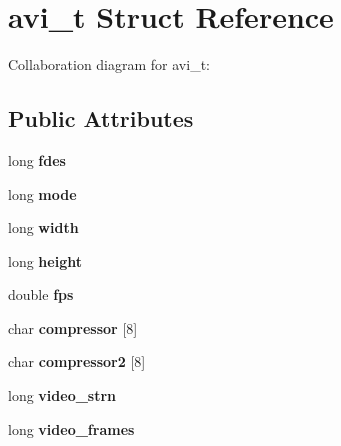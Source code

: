 \hypertarget{structavi__t}{\section{avi\+\_\+t Struct Reference}
\label{structavi__t}
}


Collaboration diagram for avi\+\_\+t\+:
\subsection*{Public Attributes}
\begin{DoxyCompactItemize}
\item 
\hypertarget{structavi__t_a6306b092bffe21a7b01c55494392ee18}{long {\bfseries fdes}}\label{structavi__t_a6306b092bffe21a7b01c55494392ee18}

\item 
\hypertarget{structavi__t_a41e8787d0a73697e8e62dc80a2c87097}{long {\bfseries mode}}\label{structavi__t_a41e8787d0a73697e8e62dc80a2c87097}

\item 
\hypertarget{structavi__t_ade6a575a3696f843805a093337dc2d0c}{long {\bfseries width}}\label{structavi__t_ade6a575a3696f843805a093337dc2d0c}

\item 
\hypertarget{structavi__t_a1ee55d9d4c78d4c9825b3ad99b1e80c9}{long {\bfseries height}}\label{structavi__t_a1ee55d9d4c78d4c9825b3ad99b1e80c9}

\item 
\hypertarget{structavi__t_a2be360f93e8c08488ca0ba6a534aee59}{double {\bfseries fps}}\label{structavi__t_a2be360f93e8c08488ca0ba6a534aee59}

\item 
\hypertarget{structavi__t_a6f7fa3d790034e7cf9e652462d57ac35}{char {\bfseries compressor} \mbox{[}8\mbox{]}}\label{structavi__t_a6f7fa3d790034e7cf9e652462d57ac35}

\item 
\hypertarget{structavi__t_a14205f462f29d5c6f0b7a13d815ebc65}{char {\bfseries compressor2} \mbox{[}8\mbox{]}}\label{structavi__t_a14205f462f29d5c6f0b7a13d815ebc65}

\item 
\hypertarget{structavi__t_a2e532c340b36e6d338e1ce559316473c}{long {\bfseries video\+\_\+strn}}\label{structavi__t_a2e532c340b36e6d338e1ce559316473c}

\item 
\hypertarget{structavi__t_a207d88059adcf8aa184606cf844e19e7}{long {\bfseries video\+\_\+frames}}\label{structavi__t_a207d88059adcf8aa184606cf844e19e7}


\end{DoxyCompactItemize}
